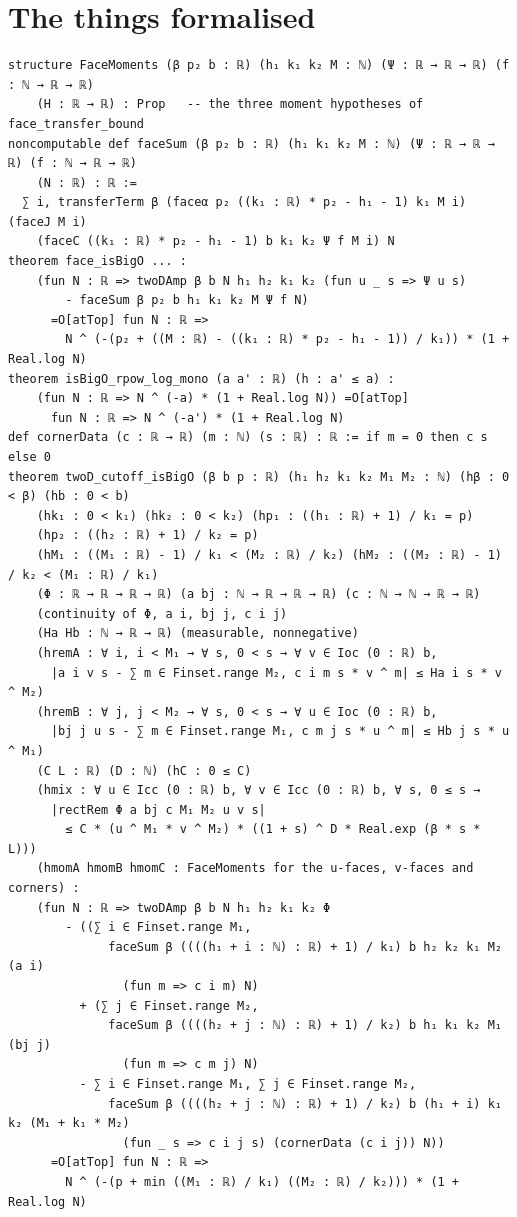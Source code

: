 \documentclass[11pt]{article}
\begin{document}
\section{The things formalised}
{\small
\begin{verbatim}
structure FaceMoments (β p₂ b : ℝ) (h₁ k₁ k₂ M : ℕ) (Ψ : ℝ → ℝ → ℝ) (f : ℕ → ℝ → ℝ)
    (H : ℝ → ℝ) : Prop   -- the three moment hypotheses of face_transfer_bound
noncomputable def faceSum (β p₂ b : ℝ) (h₁ k₁ k₂ M : ℕ) (Ψ : ℝ → ℝ → ℝ) (f : ℕ → ℝ → ℝ)
    (N : ℝ) : ℝ :=
  ∑ i, transferTerm β (faceα p₂ ((k₁ : ℝ) * p₂ - h₁ - 1) k₁ M i) (faceJ M i)
    (faceC ((k₁ : ℝ) * p₂ - h₁ - 1) b k₁ k₂ Ψ f M i) N
theorem face_isBigO ... :
    (fun N : ℝ => twoDAmp β b N h₁ h₂ k₁ k₂ (fun u _ s => Ψ u s)
        - faceSum β p₂ b h₁ k₁ k₂ M Ψ f N)
      =O[atTop] fun N : ℝ =>
        N ^ (-(p₂ + ((M : ℝ) - ((k₁ : ℝ) * p₂ - h₁ - 1)) / k₁)) * (1 + Real.log N)
theorem isBigO_rpow_log_mono (a a' : ℝ) (h : a' ≤ a) :
    (fun N : ℝ => N ^ (-a) * (1 + Real.log N)) =O[atTop]
      fun N : ℝ => N ^ (-a') * (1 + Real.log N)
def cornerData (c : ℝ → ℝ) (m : ℕ) (s : ℝ) : ℝ := if m = 0 then c s else 0
theorem twoD_cutoff_isBigO (β b p : ℝ) (h₁ h₂ k₁ k₂ M₁ M₂ : ℕ) (hβ : 0 < β) (hb : 0 < b)
    (hk₁ : 0 < k₁) (hk₂ : 0 < k₂) (hp₁ : ((h₁ : ℝ) + 1) / k₁ = p)
    (hp₂ : ((h₂ : ℝ) + 1) / k₂ = p)
    (hM₁ : ((M₁ : ℝ) - 1) / k₁ < (M₂ : ℝ) / k₂) (hM₂ : ((M₂ : ℝ) - 1) / k₂ < (M₁ : ℝ) / k₁)
    (Φ : ℝ → ℝ → ℝ → ℝ) (a bj : ℕ → ℝ → ℝ → ℝ) (c : ℕ → ℕ → ℝ → ℝ)
    (continuity of Φ, a i, bj j, c i j)
    (Ha Hb : ℕ → ℝ → ℝ) (measurable, nonnegative)
    (hremA : ∀ i, i < M₁ → ∀ s, 0 < s → ∀ v ∈ Ioc (0 : ℝ) b,
      |a i v s - ∑ m ∈ Finset.range M₂, c i m s * v ^ m| ≤ Ha i s * v ^ M₂)
    (hremB : ∀ j, j < M₂ → ∀ s, 0 < s → ∀ u ∈ Ioc (0 : ℝ) b,
      |bj j u s - ∑ m ∈ Finset.range M₁, c m j s * u ^ m| ≤ Hb j s * u ^ M₁)
    (C L : ℝ) (D : ℕ) (hC : 0 ≤ C)
    (hmix : ∀ u ∈ Icc (0 : ℝ) b, ∀ v ∈ Icc (0 : ℝ) b, ∀ s, 0 ≤ s →
      |rectRem Φ a bj c M₁ M₂ u v s|
        ≤ C * (u ^ M₁ * v ^ M₂) * ((1 + s) ^ D * Real.exp (β * s * L)))
    (hmomA hmomB hmomC : FaceMoments for the u-faces, v-faces and corners) :
    (fun N : ℝ => twoDAmp β b N h₁ h₂ k₁ k₂ Φ
        - ((∑ i ∈ Finset.range M₁,
              faceSum β ((((h₁ + i : ℕ) : ℝ) + 1) / k₁) b h₂ k₂ k₁ M₂ (a i)
                (fun m => c i m) N)
          + (∑ j ∈ Finset.range M₂,
              faceSum β ((((h₂ + j : ℕ) : ℝ) + 1) / k₂) b h₁ k₁ k₂ M₁ (bj j)
                (fun m => c m j) N)
          - ∑ i ∈ Finset.range M₁, ∑ j ∈ Finset.range M₂,
              faceSum β ((((h₂ + j : ℕ) : ℝ) + 1) / k₂) b (h₁ + i) k₁ k₂ (M₁ + k₁ * M₂)
                (fun _ s => c i j s) (cornerData (c i j)) N))
      =O[atTop] fun N : ℝ =>
        N ^ (-(p + min ((M₁ : ℝ) / k₁) ((M₂ : ℝ) / k₂))) * (1 + Real.log N)
\end{verbatim}
}
\end{document}
